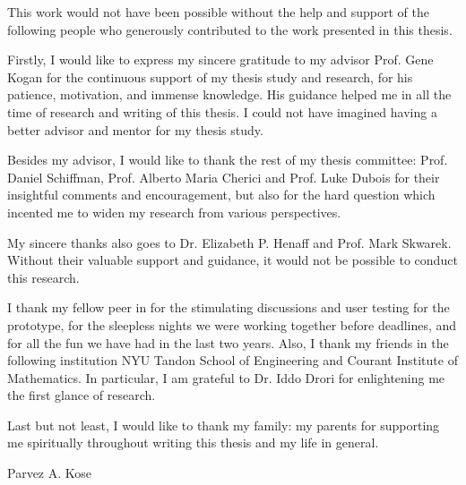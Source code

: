 %
%
%
%
%

\begin{acknowledgments} 

This work would not have been possible without the help and support of the following people who generously contributed to the work presented in this thesis.

Firstly, I would like to express my sincere gratitude to my advisor Prof. Gene Kogan for the continuous support of my thesis study and research, for his patience, motivation, and immense knowledge. His guidance helped me in all the time of research and writing of this thesis. I could not have imagined having a better advisor and mentor for my thesis study.

Besides my advisor, I would like to thank the rest of my thesis committee: Prof. Daniel Schiffman, Prof. Alberto Maria Cherici and Prof. Luke Dubois for their insightful comments and encouragement, but also for the hard question which incented me to widen my research from various perspectives.

My sincere thanks also goes to Dr. Elizabeth P. Henaff and Prof. Mark Skwarek. Without their valuable support and guidance, it would not be possible to conduct this research.

I thank my fellow peer in for the stimulating discussions and user testing for the prototype, for the sleepless nights we were working together before deadlines, and for all the fun we have had in the last two years. Also, I thank my friends in the following institution NYU Tandon School of Engineering and Courant Institute of Mathematics. In particular, I am grateful to Dr. Iddo Drori for enlightening me the first glance of research.

Last but not least, I would like to thank my family: my parents for supporting me spiritually throughout writing this thesis and my life in general.

\begin{flushright} 
Parvez A. Kose
\end{flushright}
\end{acknowledgments}